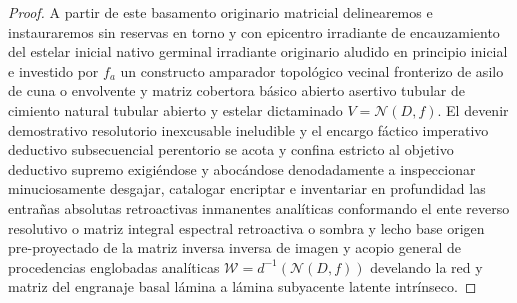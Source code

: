 \documentclass[11pt,a4paper]{article}
\theoremstyle{definition}
\theoremstyle{remark}
\numberwithin{equation}{section}
\begin{document}
\begin{proof}
A partir de este basamento originario matricial delinearemos e instauraremos sin reservas en torno y con epicentro irradiante de encauzamiento del estelar inicial nativo germinal irradiante originario aludido en principio inicial e investido por $f_a$ un constructo amparador topológico vecinal fronterizo de asilo de cuna o envolvente y matriz cobertora básico abierto asertivo tubular de cimiento natural tubular abierto y estelar dictaminado $V = \mathcal{N}(D, f)$. El devenir demostrativo resolutorio inexcusable ineludible y el encargo fáctico imperativo deductivo subsecuencial perentorio se acota y confina estricto al objetivo deductivo supremo exigiéndose y abocándose denodadamente a inspeccionar minuciosamente desgajar, catalogar encriptar e inventariar en profundidad las entrañas absolutas retroactivas inmanentes analíticas conformando el ente reverso resolutivo o matriz integral espectral retroactiva o sombra y lecho base origen pre-proyectado de la matriz inversa inversa de imagen y acopio general de procedencias englobadas analíticas $\mathcal{W} = d^{-1}(\mathcal{N}(D, f))$ develando la red y matriz del engranaje basal lámina a lámina subyacente latente intrínseco.


\end{proof}
\end{document}

